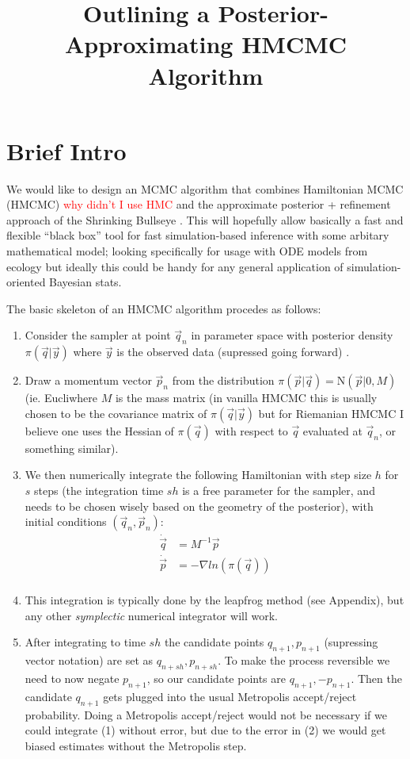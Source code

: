 \documentclass[12pt,a4paper]{article}
\title{Outlining a Posterior-Approximating HMCMC Algorithm}
\newcommand{\rojo}{\textcolor{red}}
\begin{document}
\maketitle
\section{Brief Intro}
We would like to design an MCMC algorithm that combines Hamiltonian MCMC (HMCMC) \rojo{why didn't I use HMC} \parencite{neal_mcmc_2012,betancourt_geometric_2014,betancourt_conceptual_2017} and the approximate posterior + refinement approach of the Shrinking Bullseye \parencite{conrad_accelerating_2015}.  This will hopefully allow basically a fast and flexible ``black box'' tool for fast simulation-based inference with some arbitary mathematical model; looking specifically for usage with ODE models from ecology but ideally this could be handy for any general application of simulation-oriented Bayesian stats.

The basic skeleton of an HMCMC algorithm procedes as follows:
\begin{enumerate}
\item Consider the sampler at point $\vec{q}_n$ in parameter space with posterior density $\pi(\vec{q} | \vec{y})$ where $\vec{y}$ is the observed data (supressed going forward) .
\item Draw a momentum vector $\vec{p}_n$ from the distribution $\pi(\vec{p} | \vec{q} ) = \text{N}(\vec{p} |0, M)$ (ie. Eucliwhere $M$ is the mass matrix (in vanilla HMCMC this is usually chosen to be the covariance matrix of $\pi(\vec{q}|\vec{y})$ but for Riemanian HMCMC I believe one uses the Hessian of $\pi(\vec{q})$ with respect to $\vec{q}$ evaluated at $\vec{q}_n$, or something similar).
\item We then numerically integrate the following Hamiltonian with step size $h$ for $s$ steps (the integration time $sh$ is a free parameter for the sampler, and needs to be chosen wisely based on the geometry of the posterior), with initial conditions $(\vec{q}_n, \vec{p}_n)$:
\begin{equation}
\begin{split}
\dot{\vec{q}} &= M^{-1} \vec{p} \\
\dot{\vec{p}} &= - \nabla ln(\pi(\vec{q}))\\
\end{split}
\end{equation}
\item This integration is typically done by the leapfrog method (see Appendix), but any other \textit{symplectic} numerical integrator will work.
\item After integrating to time $sh$ the candidate points $q_{n+1}, p_{n+1}$ (supressing vector notation) are set as $q_{n+sh}, p_{n+sh}$.  To make the process reversible we need to now negate $p_{n+1}$, so our candidate points are $q_{n+1}, -p_{n+1}$.  Then the candidate $q_{n+1}$ gets plugged into the usual Metropolis accept/reject probability.  Doing a Metropolis accept/reject would not be necessary if we could integrate (1) without error, but due to the error in (2) we would get biased estimates without the Metropolis step.
\end{enumerate}
\end{document}
